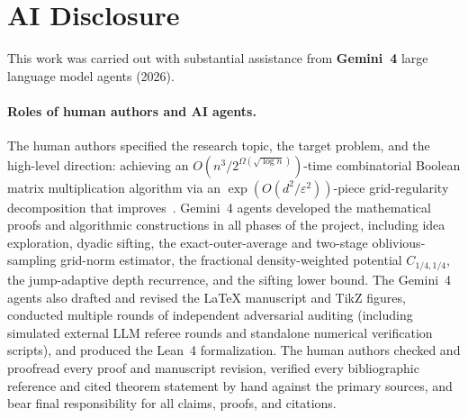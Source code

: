 \documentclass[11pt]{article}
\theoremstyle{definition}
\renewcommand{\label}[1]{}%
\newcommand{\pot}{C_{1/4,1/4}}
\begin{document}
\section{AI Disclosure}
\label{sec:ai-disclosure}

This work was carried out with substantial assistance from \textbf{Gemini~4} large language model agents (2026).

\paragraph{Roles of human authors and AI agents.}
The human authors specified the research topic, the target problem, and the high-level direction: achieving an $O(n^3 / 2^{\Omega(\sqrt{\log n})})$-time combinatorial Boolean matrix multiplication algorithm via an $\exp(O(d^2 / \varepsilon^2))$-piece grid-regularity decomposition that improves~\cite{AFKLM24}. Gemini~4 agents developed the mathematical proofs and algorithmic constructions in all phases of the project, including idea exploration, dyadic sifting, the exact-outer-average and two-stage oblivious-sampling grid-norm estimator, the fractional density-weighted potential $\pot$, the jump-adaptive depth recurrence, and the sifting lower bound. The Gemini~4 agents also drafted and revised the \LaTeX{} manuscript and TikZ figures, conducted multiple rounds of independent adversarial auditing (including simulated external LLM referee rounds and standalone numerical verification scripts), and produced the Lean~4 formalization. The human authors checked and proofread every proof and manuscript revision, verified every bibliographic reference and cited theorem statement by hand against the primary sources, and bear final responsibility for all claims, proofs, and citations.
\end{document}
